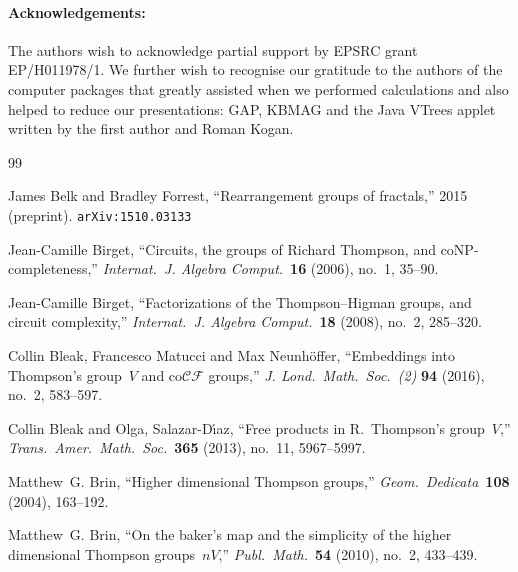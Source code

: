 \documentclass[a4paper,11pt]{article}
\numberwithin{equation}{section}
\newcommand{\GAP}{\textsf{GAP}}
\begin{document}
\paragraph{Acknowledgements:} The authors wish to acknowledge partial
support by EPSRC grant EP/H011978/1.  We further wish to recognise our
gratitude to the authors of the computer packages that greatly
assisted when we performed calculations and also helped to reduce our
presentations: \GAP, KBMAG and the Java VTrees applet written by the
first author and Roman Kogan.

\begin{thebibliography}{99}


  James Belk and Bradley Forrest, ``Rearrangement groups of
  fractals,'' 2015 (preprint).  \texttt{arXiv:1510.03133}

  Jean-Camille Birget, ``Circuits, the groups of Richard Thompson, and
  coNP-completeness,'' \textit{Internat.\ J. Algebra
    Comput.}~\textbf{16} (2006), no.~1, 35--90.

  Jean-Camille Birget, ``Factorizations of the Thompson--Higman
  groups, and circuit complexity,'' \textit{Internat.\ J. Algebra
    Comput.}~\textbf{18} (2008), no.~2, 285--320.

  Collin Bleak, Francesco Matucci and Max Neunh\"{o}ffer, ``Embeddings
  into Thompson's group~$V$ and co$\mathcal{CF}$ groups,''
  \textit{J. Lond.\ Math.\ Soc.~(2)} \textbf{94} (2016), no.~2,
  583--597.

  Collin Bleak and Olga, Salazar-D\'{\i}az, ``Free products in
  R.~Thompson's group~$V$,''
  \textit{Trans.\ Amer.\ Math.\ Soc.}~\textbf{365} (2013), no.~11,
  5967--5997.


  Matthew~G. Brin, ``Higher dimensional Thompson groups,''
  \textit{Geom.\ Dedicata}~\textbf{108} (2004), 163--192.

  Matthew~G. Brin, ``On the baker's map and the simplicity of the
  higher dimensional Thompson groups~$nV$,''
  \textit{Publ.\ Math.}~\textbf{54} (2010), no.~2, 433--439.


\end{thebibliography}
\end{document}
